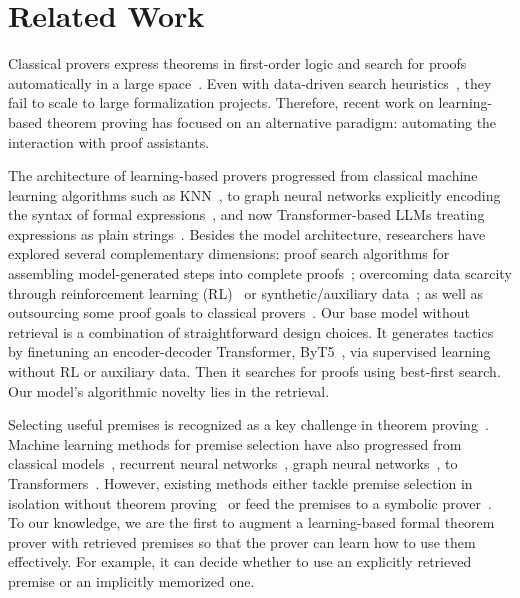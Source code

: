\section{Related Work}

Classical provers express theorems in first-order logic and search for proofs automatically in a large space~\cite{robinson2001handbook,kovacs2013first}. Even with data-driven search heuristics~\cite{loos2017deep,bridge2014machine}, they fail to scale to large formalization projects. Therefore, recent work on learning-based theorem proving has focused on an alternative paradigm: automating the interaction with proof assistants. 

The architecture of learning-based provers progressed from classical machine learning algorithms such as KNN~\cite{gauthier2021tactictoe}, to graph neural networks explicitly encoding the syntax of formal expressions~\cite{yang2019learning,paliwal2020graph}, and now Transformer-based LLMs treating expressions as plain strings~\cite{polu2020generative}. Besides the model architecture, researchers have explored several complementary dimensions: proof search algorithms for assembling model-generated steps into complete proofs~\cite{lample2022hypertree,wang2023dt}; overcoming data scarcity through reinforcement learning (RL)~\cite{bansal2019learning,wu2021tacticzero,lample2022hypertree,polu2023formal} or synthetic/auxiliary data~\cite{wang2020learning,rabe2021mathematical,wu2021lime,han2022proof}; as well as outsourcing some proof goals to classical provers~\cite{bohme2010sledgehammer,blanchette2016hammering,czajka2018hammer,jiang2022thor}. Our base model without retrieval is a combination of straightforward design choices. It generates tactics by finetuning an encoder-decoder Transformer, ByT5~\cite{xue2022byt5}, via supervised learning without RL or auxiliary data. Then it searches for proofs using best-first search. Our model's algorithmic novelty lies in the retrieval.


Selecting useful premises is recognized as a key challenge in theorem proving~\cite{urban2004mptp,irving2016deepmath,szegedy2021retrieval,wu2022formal}. Machine learning methods for premise selection have also progressed from classical models~\cite{alama2014premise,bohme2010sledgehammer,piotrowski2023machinelearned}, recurrent neural networks~\cite{irving2016deepmath}, graph neural networks~\cite{wang2020learning}, to Transformers~\cite{mikula2023magnushammer,yeh2023coprover}. However, existing methods either tackle premise selection in isolation without theorem proving~\cite{piotrowski2023machinelearned,irving2016deepmath,wang2020learning} or feed the premises to a symbolic prover~\cite{alama2014premise,bohme2010sledgehammer,mikula2023magnushammer}. To our knowledge, we are the first to augment a learning-based formal theorem prover with retrieved premises so that the prover can learn how to use them effectively. For example, it can decide whether to use an explicitly retrieved premise or an implicitly memorized one.


